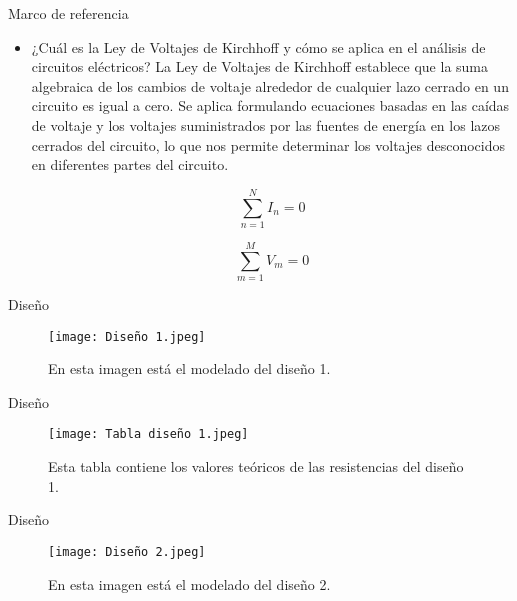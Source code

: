 \documentclass[svgnames, aspectratio=169]{beamer}
\begin{document}
    \begin{frame}{Marco de referencia}
\begin{itemize}
        \item ¿Cuál es la Ley de Voltajes de Kirchhoff y cómo se aplica en el análisis de circuitos eléctricos?
    La Ley de Voltajes de Kirchhoff establece que la suma algebraica de los cambios de voltaje alrededor de cualquier lazo cerrado en un circuito es igual a cero. Se aplica formulando ecuaciones basadas en las caídas de voltaje y los voltajes suministrados por las fuentes de energía en los lazos cerrados del circuito, lo que nos permite determinar los voltajes desconocidos en diferentes partes del circuito.

    \begin{equation}
    \sum_{n=1}^{N} I_n = 0
\end{equation}

\begin{equation}
    \sum_{m=1}^{M} V_m = 0
\end{equation}

\end{itemize}
\end{frame}

\begin{frame}{Diseño}

\begin{figure}[h]
    \centering
    \texttt{[image: Diseño 1.jpeg]}
    \caption{En esta imagen está el modelado del diseño 1.}
\end{figure}

\end{frame}

\begin{frame}{Diseño}

\begin{figure}[h]
    \centering
    \texttt{[image: Tabla diseño 1.jpeg]}
    \caption{Esta tabla contiene los valores teóricos de las resistencias del diseño 1.}
\end{figure}

\end{frame}

\begin{frame}{Diseño}

\begin{figure}[h]
    \centering
    \texttt{[image: Diseño 2.jpeg]}
    \caption{En esta imagen está el modelado del diseño 2.}
\end{figure}

\end{frame}
\end{document}
